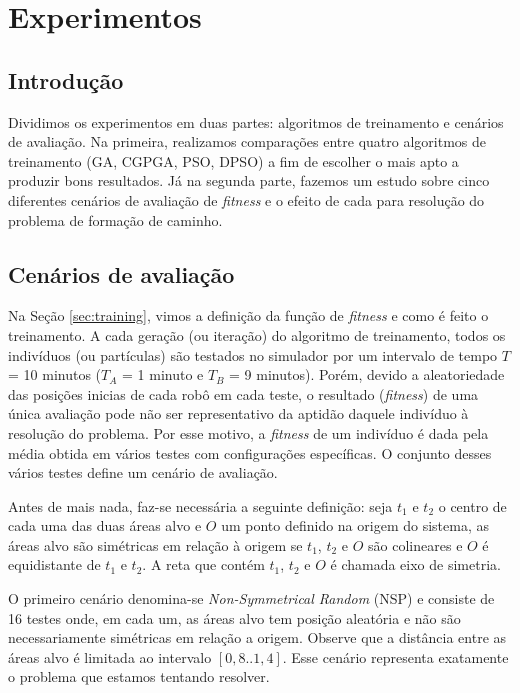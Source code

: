 \chapter{Experimentos}
\label{experimentos}

\section{Introdução}

Dividimos os experimentos em duas partes: algoritmos de treinamento e cenários de avaliação. Na primeira, realizamos comparações entre quatro algoritmos de treinamento (GA, CGPGA, PSO, DPSO) a fim de escolher o mais apto a produzir bons resultados. Já na segunda parte, fazemos um estudo sobre cinco diferentes cenários de avaliação de \textit{fitness} e o efeito de cada para resolução do problema de formação de caminho.

\section{Cenários de avaliação}

Na Seção \ref{sec:training}, vimos a definição da função de \textit{fitness} e como é feito o treinamento. A cada geração (ou iteração) do algoritmo de treinamento, todos os indivíduos (ou partículas) são testados no simulador por um intervalo de tempo $T$ = 10 minutos ($T_{A}$ = 1 minuto e $T_{B}$ = 9 minutos). Porém, devido a aleatoriedade das posições inicias de cada robô em cada teste, o resultado (\textit{fitness}) de uma única avaliação pode não ser representativo da aptidão daquele indivíduo à resolução do problema. Por esse motivo, a \textit{fitness} de um indivíduo é dada pela média obtida em vários testes com configurações específicas. O conjunto desses vários testes define um cenário de avaliação.

Antes de mais nada, faz-se necessária a seguinte definição: seja $t_{1}$ e $t_{2}$ o centro de cada uma das duas áreas alvo e $O$ um ponto definido na origem do sistema, as áreas alvo são simétricas em relação à origem se $t_{1}$, $t_{2}$ e $O$ são colineares e $O$ é equidistante de $t_{1}$ e $t_{2}$. A reta que contém $t_{1}$, $t_{2}$ e $O$ é chamada eixo de simetria.

O primeiro cenário denomina-se \textit{Non-Symmetrical Random} (NSP) e consiste de 16 testes onde, em cada um, as áreas alvo tem posição aleatória e não são necessariamente simétricas em relação a origem. Observe que a distância entre as áreas alvo é limitada ao intervalo $[0,8..1,4]$. Esse cenário representa exatamente o problema que estamos tentando resolver.


